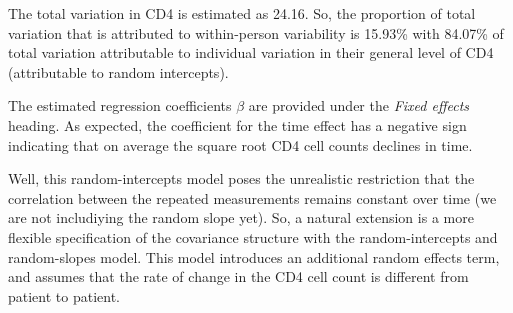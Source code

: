 \documentclass[]{book}
\makeatletter
\newenvironment{Shaded}{\begin{snugshade}}{\end{snugshade}}
\newcommand{\KeywordTok}[1]{\textcolor[rgb]{0.13,0.29,0.53}{\textbf{#1}}}
\newcommand{\DecValTok}[1]{\textcolor[rgb]{0.00,0.00,0.81}{#1}}
\newcommand{\StringTok}[1]{\textcolor[rgb]{0.31,0.60,0.02}{#1}}
\newcommand{\CommentTok}[1]{\textcolor[rgb]{0.56,0.35,0.01}{\textit{#1}}}
\newcommand{\OperatorTok}[1]{\textcolor[rgb]{0.81,0.36,0.00}{\textbf{#1}}}
\newcommand{\NormalTok}[1]{#1}
\newenvironment{kframe}{%
\medskip{}
\setlength{\fboxsep}{.8em}
 \def\at@end@of@kframe{}%
 \ifinner\ifhmode%
  \def\at@end@of@kframe{\end{minipage}}%
  \begin{minipage}{\columnwidth}%
 \fi\fi%
 \def\FrameCommand##1{\hskip\@totalleftmargin \hskip-\fboxsep
 \colorbox{shadecolor}{##1}\hskip-\fboxsep
     \hskip-\linewidth \hskip-\@totalleftmargin \hskip\columnwidth}%
 \MakeFramed {\advance\hsize-\width
   \@totalleftmargin\z@ \linewidth\hsize
   \@setminipage}}%
 {\par\unskip\endMakeFramed%
 \at@end@of@kframe}
\renewenvironment{Shaded}{\begin{kframe}}{\end{kframe}}
\theoremstyle{definition}
\theoremstyle{definition}
\theoremstyle{definition}
\theoremstyle{remark}
\makeatother
\begin{document}
\begin{Shaded}
\end{Shaded}

The total variation in CD4 is estimated as 24.16. So, the proportion of
total variation that is attributed to within-person variability is
15.93\% with 84.07\% of total variation attributable to individual
variation in their general level of CD4 (attributable to random
intercepts).

The estimated regression coefficients \(\beta\) are provided under the
\emph{Fixed effects} heading. As expected, the coefficient for the time
effect has a negative sign indicating that on average the square root
CD4 cell counts declines in time.

Well, this random-intercepts model poses the unrealistic restriction
that the correlation between the repeated measurements remains constant
over time (we are not includiying the random slope yet). So, a natural
extension is a more flexible specification of the covariance structure
with the random-intercepts and random-slopes model. This model
introduces an additional random effects term, and assumes that the rate
of change in the CD4 cell count is different from patient to patient.
\end{document}
